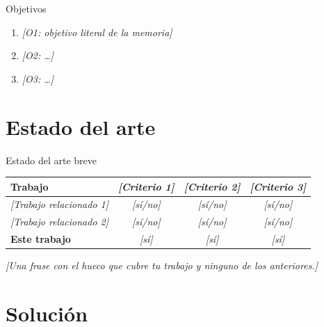 \documentclass[11pt, aspectratio=169]{beamer}
\newcommand{\ph}[1]{\texorpdfstring{\textcolor{grisplaceholder}{\textit{[#1]}}}{[#1]}}
\begin{document}
\begin{frame}{Objetivos}
  \begin{enumerate}
    \item \ph{O1: objetivo literal de la memoria}
    \item \ph{O2: \dots}
    \item \ph{O3: \dots}
  \end{enumerate}
\end{frame}

\section{Estado del arte}

\begin{frame}{Estado del arte breve}
  \begin{center}
    \begin{tabular}{lccc}
      \toprule
      \textbf{Trabajo} & \ph{Criterio 1} & \ph{Criterio 2} & \ph{Criterio 3} \\
      \midrule
      \ph{Trabajo relacionado 1} & \ph{sí/no} & \ph{sí/no} & \ph{sí/no} \\
      \ph{Trabajo relacionado 2} & \ph{sí/no} & \ph{sí/no} & \ph{sí/no} \\
      \textbf{Este trabajo} & \ph{sí} & \ph{sí} & \ph{sí} \\
      \bottomrule
    \end{tabular}
  \end{center}
  \ph{Una frase con el hueco que cubre tu trabajo y ninguno de los
  anteriores.}
\end{frame}

\section{Solución}
\end{document}

